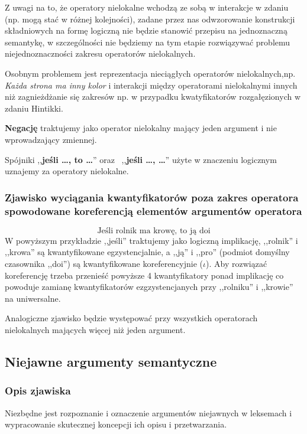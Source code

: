 \documentclass[a4paper, 12pt]{article}
\theoremstyle{remark}
\begin{document}
Z uwagi na to, że operatory nielokalne wchodzą ze sobą w interakcje w zdaniu (np. mogą stać w różnej kolejności),
zadane przez nas odwzorowanie konstrukcji składniowych na formę logiczną nie będzie stanowić przepisu na jednoznaczną semantykę,
w szczególności nie będziemy na tym etapie rozwiązywać problemu niejednoznaczności zakresu operatorów nielokalnych.

Osobnym problemem jest reprezentacja nieciągłych operatorów nielokalnych,np. \emph{Każda strona ma inny kolor} i interakcji między operatorami nielokalnymi innych niż zagnieżdżanie się zakresów
np. w przypadku kwatyfikatorów rozgałęzionych w zdaniu Hintikki.

\textbf{Negację} traktujemy jako operator nielokalny mający jeden argument i nie wprowadzający zmiennej.

Spójniki ,,\textbf{jeśli \dots, to \dots}'' oraz~ ,,\textbf{jeśli \dots, \dots}'' użyte w znaczeniu logicznym uznajemy za operatory nielokalne.



\subsubsection{Zjawisko wyciągania kwantyfikatorów poza zakres operatora spowodowane koreferencją elementów argumentów operatora}
\begin{equation}
	\text{Jeśli rolnik ma krowę, to ją doi}
\end{equation}
W powyższym przykładzie ,,jeśli'' traktujemy jako logiczną implikację, ,,rolnik'' i ,,krowa'' są kwantyfikowane egzystencjalnie, a 
,,ją'' i ,,pro'' (podmiot domyślny czasownika ,,doi'') są kwantyfikowane koreferencyjnie ($\iota$). 
Aby rozwiązać koreferencję trzeba przenieść powyższe 4 kwantyfikatory ponad implikację co powoduje
zamianę kwantyfikatorów  ezgzystencjanych przy ,,rolniku'' i ,,krowie'' na uniwersalne. 

Analogiczne zjawisko będzie występować przy wszystkich operatorach nielokalnych mających więcej niż jeden argument.

\subsection{Niejawne argumenty semantyczne} %
{
\renewcommand\thesubsection{}
\renewcommand\thesubsubsection{}
\setcounter{subsection}{-1}
\subsubsection{Opis zjawiska} %
\label{sub:definicja_robocza2}
}
Niezbędne jest rozpoznanie i oznaczenie argumentów niejawnych w leksemach i wypracowanie skutecznej koncepcji ich opisu i przetwarzania.
\end{document}
